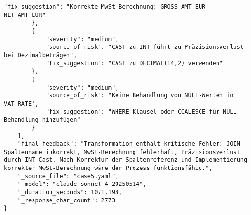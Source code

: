 \begin{lstlisting}[caption={Ausgabe: Claude Sonnet 4 Anwendungsfall 5 Hauptdurchlauf},label={claude_case5_prompt1}]
            "fix_suggestion": "Korrekte MwSt-Berechnung: GROSS_AMT_EUR - NET_AMT_EUR"
        },
        {
            "severity": "medium",
            "source_of_risk": "CAST zu INT führt zu Präzisionsverlust bei Dezimalbeträgen",
            "fix_suggestion": "CAST zu DECIMAL(14,2) verwenden"
        },
        {
            "severity": "medium",
            "source_of_risk": "Keine Behandlung von NULL-Werten in VAT_RATE",
            "fix_suggestion": "WHERE-Klausel oder COALESCE für NULL-Behandlung hinzufügen"
        }
    ],
    "final_feedback": "Transformation enthält kritische Fehler: JOIN-Spaltenname inkorrekt, MwSt-Berechnung fehlerhaft, Präzisionsverlust durch INT-Cast. Nach Korrektur der Spaltenreferenz und Implementierung korrekter MwSt-Berechnung wäre der Prozess funktionsfähig.",
    "_source_file": "case5.yaml",
    "_model": "claude-sonnet-4-20250514",
    "_duration_seconds": 1071.193,
    "_response_char_count": 2773
}
\end{lstlisting}

